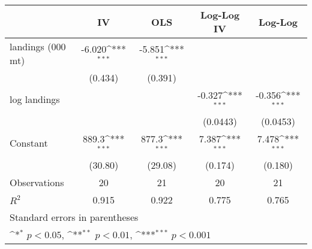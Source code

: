 {
\def\sym#1{\ifmmode^{#1}\else\(^{#1}\)\fi}
\begin{tabular}{l*{4}{c}}
\hline\hline
                &       IV         &      OLS         &Log-Log IV         &  Log-Log         \\
\hline
landings (000 mt)&   -6.020\sym{***}&   -5.851\sym{***}&                  &                  \\
                &  (0.434)         &  (0.391)         &                  &                  \\
[1em]
log landings    &                  &                  &   -0.327\sym{***}&   -0.356\sym{***}\\
                &                  &                  & (0.0443)         & (0.0453)         \\
[1em]
Constant        &    889.3\sym{***}&    877.3\sym{***}&    7.387\sym{***}&    7.478\sym{***}\\
                &  (30.80)         &  (29.08)         &  (0.174)         &  (0.180)         \\
\hline
Observations    &       20         &       21         &       20         &       21         \\
\(R^{2}\)       &    0.915         &    0.922         &    0.775         &    0.765         \\
\hline\hline
\multicolumn{5}{l}{\footnotesize Standard errors in parentheses}\\
\multicolumn{5}{l}{\footnotesize \sym{*} \(p<0.05\), \sym{**} \(p<0.01\), \sym{***} \(p<0.001\)}\\
\end{tabular}
}
